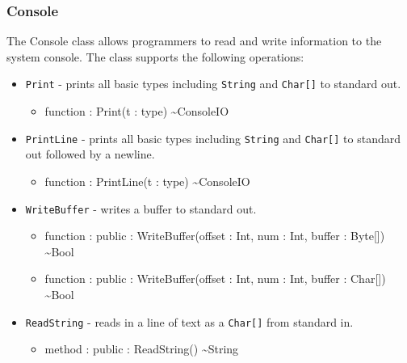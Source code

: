 \documentclass[11pt]{article}
\begin{document}
\subsubsection{Console}
The Console class allows programmers to read and write information to
the system console.  The class supports the following operations:
\begin{itemize}
\item \texttt{Print} - prints all basic types including
  \texttt{String} and \texttt{Char[]} to standard out.
  \begin{itemize}
  \item function : Print(t : type) \textasciitilde ConsoleIO
  \end{itemize}
\item \texttt{PrintLine} - prints all basic types including
  \texttt{String} and \texttt{Char[]} to standard out followed by a
  newline.
  \begin{itemize}
  \item function : PrintLine(t : type) \textasciitilde ConsoleIO
  \end{itemize}
\item \texttt{WriteBuffer} - writes a buffer to standard out.
  \begin{itemize}
  \item function : public : WriteBuffer(offset : Int, num : Int,
    buffer : Byte[]) \textasciitilde Bool
  \item function : public : WriteBuffer(offset : Int, num : Int,
    buffer : Char[]) \textasciitilde Bool
  \end{itemize}
\item \texttt{ReadString} - reads in a line of text as a
  \texttt{Char[]} from standard in.
  \begin{itemize}
  \item method : public : ReadString() \textasciitilde String
  \end{itemize}
\end{itemize}
\end{document}
